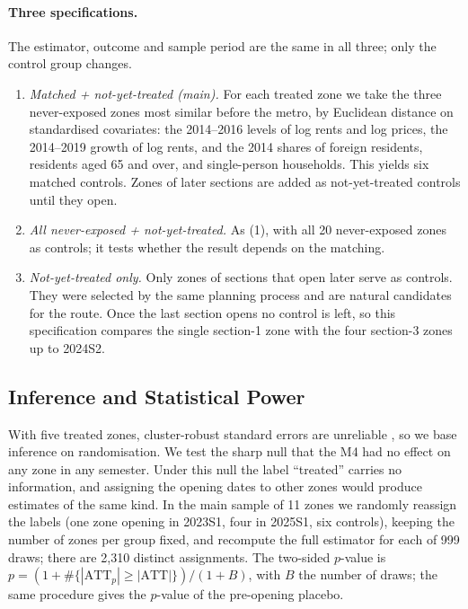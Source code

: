 \paragraph{Three specifications.} The estimator, outcome and sample period are the same in all three; only the control group changes.
\begin{enumerate}
\item \textit{Matched + not-yet-treated (main).} For each treated zone we take the three never-exposed zones most similar before the metro, by Euclidean distance on standardised covariates: the 2014--2016 levels of log rents and log prices, the 2014--2019 growth of log rents, and the 2014 shares of foreign residents, residents aged 65 and over, and single-person households. This yields six matched controls. Zones of later sections are added as not-yet-treated controls until they open.
\item \textit{All never-exposed + not-yet-treated.} As (1), with all 20 never-exposed zones as controls; it tests whether the result depends on the matching.
\item \textit{Not-yet-treated only.} Only zones of sections that open later serve as controls. They were selected by the same planning process and are natural candidates for the route. Once the last section opens no control is left, so this specification compares the single section-1 zone with the four section-3 zones up to 2024S2.
\end{enumerate}

\subsection*{Inference and Statistical Power}

With five treated zones, cluster-robust standard errors are unreliable \cite{conley2011,mackinnon2018}, so we base inference on randomisation. We test the sharp null that the M4 had no effect on any zone in any semester. Under this null the label ``treated'' carries no information, and assigning the opening dates to other zones would produce estimates of the same kind. In the main sample of 11 zones we randomly reassign the labels (one zone opening in 2023S1, four in 2025S1, six controls), keeping the number of zones per group fixed, and recompute the full estimator for each of 999 draws; there are 2,310 distinct assignments. The two-sided $p$-value is $p=(1+\#\{|\mathrm{ATT}_p|\ge|\mathrm{ATT}|\})/(1+B)$, with $B$ the number of draws; the same procedure gives the $p$-value of the pre-opening placebo.

